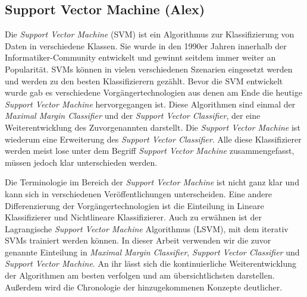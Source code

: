 \subsection{Support Vector Machine (Alex)}
Die \textit{Support Vector Machine} (SVM) ist ein Algorithmus zur Klassifizierung von Daten in verschiedene Klassen.
Sie wurde in den 1990er Jahren innerhalb der Informatiker-Community entwickelt und gewinnt seitdem immer weiter an Popularität.
SVMs können in vielen verschiedenen Szenarien eingesetzt werden und werden zu den besten Klassifizierern gezählt.
Bevor die SVM entwickelt wurde gab es verschiedene Vorgängertechnologien aus denen am Ende die heutige \textit{Support Vector Machine} hervorgegangen ist. 
Diese Algorithmen sind einmal der \textit{Maximal Margin Classifier} und der \textit{Support Vector Classifier}, 
der eine Weiterentwicklung des Zuvorgenannten darstellt.
Die \textit{Support Vector Machine} ist wiederum eine Erweiterung des \textit{Support Vector Classifier}.
Alle diese Klassifizierer werden meist lose unter dem Begriff \textit{Support Vector Machine} zusammengefasst,
müssen jedoch klar unterschieden werden.\cite[S. 337]{james_2013}

Die Terminologie im Bereich der \textit{Support Vector Machine} ist nicht ganz klar und kann sich in verschiedenen Veröffentlichungen unterscheiden.
Eine andere Differenzierung der Vorgängertechnologien ist die Einteilung in Lineare Klassifizierer und Nichtlineare Klassifizierer.
Auch zu erwähnen ist der Lagrangische \textit{Support Vector Machine} Algorithmus (LSVM), mit dem iterativ SVMs trainiert werden können.\cite[S. 207]{suthaharan_2015}
In dieser Arbeit verwenden wir die zuvor genannte Einteilung in \textit{Maximal Margin Classifier}, \textit{Support Vector Classifier}
und \textit{Support Vector Machine}. An ihr lässt sich die kontinuierliche Weiterentwicklung der Algorithmen am besten verfolgen und am übersichtlichsten darstellen.
Außerdem wird die Chronologie der hinzugekommenen Konzepte deutlicher.

